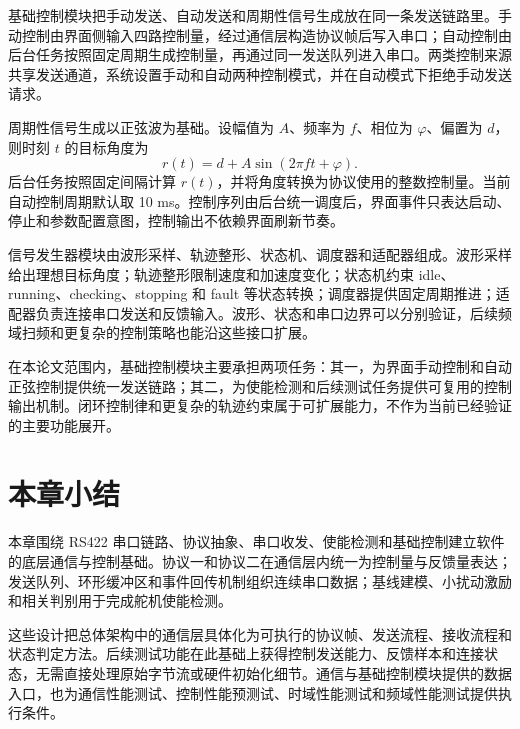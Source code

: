 基础控制模块把手动发送、自动发送和周期性信号生成放在同一条发送链路里。手动控制由界面侧输入四路控制量，经过通信层构造协议帧后写入串口；自动控制由后台任务按照固定周期生成控制量，再通过同一发送队列进入串口。两类控制来源共享发送通道，系统设置手动和自动两种控制模式，并在自动模式下拒绝手动发送请求。

周期性信号生成以正弦波为基础。设幅值为 $A$、频率为 $f$、相位为 $\varphi$、偏置为 $d$，则时刻 $t$ 的目标角度为
\begin{equation}
  r(t)=d+A\sin(2\pi ft+\varphi).
\end{equation}
后台任务按照固定间隔计算 $r(t)$，并将角度转换为协议使用的整数控制量。当前自动控制周期默认取 10 ms。控制序列由后台统一调度后，界面事件只表达启动、停止和参数配置意图，控制输出不依赖界面刷新节奏。

信号发生器模块由波形采样、轨迹整形、状态机、调度器和适配器组成。波形采样给出理想目标角度；轨迹整形限制速度和加速度变化；状态机约束 idle、running、checking、stopping 和 fault 等状态转换；调度器提供固定周期推进；适配器负责连接串口发送和反馈输入。波形、状态和串口边界可以分别验证，后续频域扫频和更复杂的控制策略也能沿这些接口扩展。

在本论文范围内，基础控制模块主要承担两项任务：其一，为界面手动控制和自动正弦控制提供统一发送链路；其二，为使能检测和后续测试任务提供可复用的控制输出机制。闭环控制律和更复杂的轨迹约束属于可扩展能力，不作为当前已经验证的主要功能展开。

\section{本章小结}

本章围绕 RS422 串口链路、协议抽象、串口收发、使能检测和基础控制建立软件的底层通信与控制基础。协议一和协议二在通信层内统一为控制量与反馈量表达；发送队列、环形缓冲区和事件回传机制组织连续串口数据；基线建模、小扰动激励和相关判别用于完成舵机使能检测。

这些设计把总体架构中的通信层具体化为可执行的协议帧、发送流程、接收流程和状态判定方法。后续测试功能在此基础上获得控制发送能力、反馈样本和连接状态，无需直接处理原始字节流或硬件初始化细节。通信与基础控制模块提供的数据入口，也为通信性能测试、控制性能预测试、时域性能测试和频域性能测试提供执行条件。

